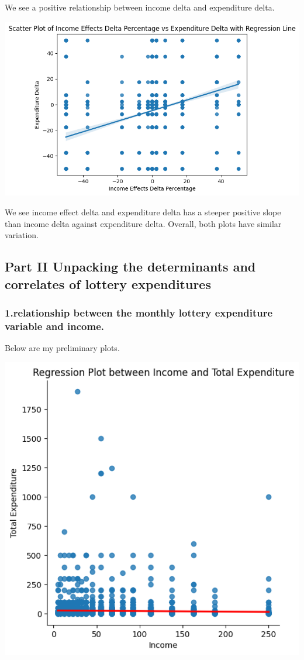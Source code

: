 \documentclass[
  12pt]{article}
\begin{document}
We see a positive relationship between income delta and expenditure
delta.

\includegraphics{images/17-01.png}

We see income effect delta and expenditure delta has a steeper positive
slope than income delta against expenditure delta. Overall, both plots
have similar variation.

\subsection{Part II Unpacking the determinants and correlates of lottery
expenditures}\label{part-ii-unpacking-the-determinants-and-correlates-of-lottery-expenditures}

\subsubsection{1.relationship between the monthly lottery expenditure
variable and
income.}\label{relationship-between-the-monthly-lottery-expenditure-variable-and-income.}

Below are my preliminary plots.

\includegraphics{images/18-01.png}
\end{document}
